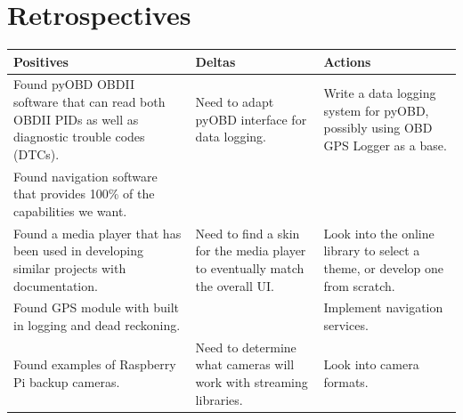 \documentclass[onecolumn, draftclsnofoot,10pt, compsoc]{IEEEtran}
\begin{document}
\section{Retrospectives}
\vspace{20pt}
\begin{center}
    \begin{tabular}{ | p{5cm} | p{5cm} | p{5cm} |}
    \hline
    \textbf{Positives} & \textbf{Deltas} & \textbf{Actions} \\ \hline
    Found pyOBD OBDII software that can read both OBDII PIDs as well as diagnostic trouble codes (DTCs). & Need to adapt pyOBD interface for data logging. & Write a data logging system for pyOBD, possibly using OBD GPS Logger as a base. \\ \hline
    Found navigation software that provides 100\% of the capabilities we want. & & \\ \hline
    Found a media player that has been used in developing similar projects with documentation.  & Need to find a skin for the media player to eventually match the overall UI. & Look into the online library to select a theme, or develop one from scratch. \\ \hline
    Found GPS module with built in logging and dead reckoning. & & Implement navigation services. \\ \hline
    Found examples of Raspberry Pi backup cameras. & Need to determine what cameras will work with streaming libraries. & Look into camera formats. \\ \hline
    \end{tabular}
\end{center}
\end{document}
